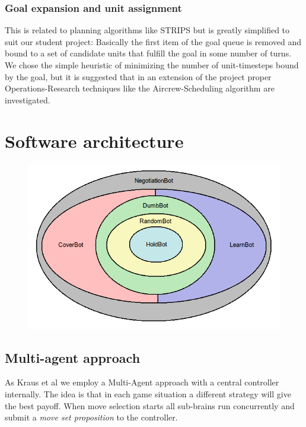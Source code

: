 \documentclass[pdftex,12pt,a4paper]{report}
\begin{document}
\subsection{Goal expansion and unit assignment}
This is related to planning algorithms like STRIPS but is
greatly simplified to suit our student project: Basically
the first item of the goal queue is removed and bound to
a set of candidate units that fulfill the goal in some 
number of turns. We chose the simple heuristic of minimizing
the number of unit-timesteps bound by the goal, but it 
is suggested that in an extension of the project proper
Operations-Research techniques like the Aircrew-Scheduling
algorithm are investigated.


\pagebreak


\chapter{Software architecture}

\begin{figure}

\includegraphics{./report4_onion.png}

\end{figure}

\section{Multi-agent approach}

As Kraus et al \cite{Kraus95} we employ a Multi-Agent approach with a 
central controller internally. The idea is that in each game situation
a different strategy will give the best payoff. When move selection starts
all sub-brains run concurrently and submit a \textit{move set proposition} to
the controller. 
\end{document}
